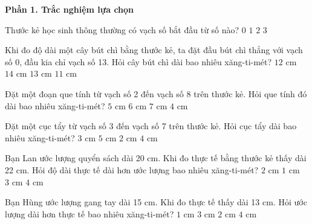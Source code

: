 \textbf{Phần 1. Trắc nghiệm lựa chọn}

\begin{ex} %
Thước kẻ học sinh thông thường có vạch số bắt đầu từ số nào?
\choice
{\True $0$}
{$1$}
{$2$}
{$3$}
\end{ex}

\begin{ex} %
Khi đo độ dài một cây bút chì bằng thước kẻ, ta đặt đầu bút chì thẳng với vạch số 0, đầu kia chỉ vạch số 13. Hỏi cây bút chì dài bao nhiêu xăng-ti-mét?
\choice
{$12\text{ cm}$}
{$14\text{ cm}$}
{\True $13\text{ cm}$}
{$11\text{ cm}$}
\end{ex}

\begin{ex} %
Đặt một đoạn que tính từ vạch số 2 đến vạch số 8 trên thước kẻ. Hỏi que tính đó dài bao nhiêu xăng-ti-mét?
\choice
{$5\text{ cm}$}
{\True $6\text{ cm}$}
{$7\text{ cm}$}
{$4\text{ cm}$}
\end{ex}

\begin{ex} %
Đặt một cục tẩy từ vạch số 3 đến vạch số 7 trên thước kẻ. Hỏi cục tẩy dài bao nhiêu xăng-ti-mét?
\choice
{$3\text{ cm}$}
{$5\text{ cm}$}
{$2\text{ cm}$}
{\True $4\text{ cm}$}
\end{ex}

\begin{ex} %
Bạn Lan ước lượng quyển sách dài 20 cm. Khi đo thực tế bằng thước kẻ thấy dài 22 cm. Hỏi độ dài thực tế dài hơn ước lượng bao nhiêu xăng-ti-mét?
\choice
{\True $2\text{ cm}$}
{$1\text{ cm}$}
{$3\text{ cm}$}
{$4\text{ cm}$}
\end{ex}

\begin{ex} %
Bạn Hùng ước lượng gang tay dài 15 cm. Khi đo thực tế thấy dài 13 cm. Hỏi ước lượng dài hơn thực tế bao nhiêu xăng-ti-mét?
\choice
{$1\text{ cm}$}
{$3\text{ cm}$}
{\True $2\text{ cm}$}
{$4\text{ cm}$}
\end{ex}


